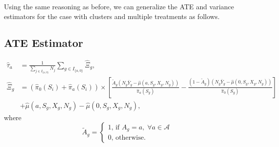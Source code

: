 \documentclass{article}
\begin{document}
Using the same reasoning as before, we can generalize the ATE and variance estimators for the case with clusters and multiple treatments as follows.
\subsection*{ATE Estimator}
\begin{align}
\hat{\tau}_a &= \frac{1}{\sum_{j \in I_{\{a,0\}}}N_j} \sum_{g \in I_{\{a,0\}}} \hat{\Xi}_g, \nonumber \\
\hat{\Xi}_g &= (\hat{\pi}_0(S_i) + \hat{\pi}_a(S_i)) \times \left[\frac{\tilde{A}_g \left(N_g\bar{Y}_g - \hat{\mu}(a,S_g,X_g,N_g)\right)}{\hat{\pi}_a(S_g)} - \frac{(1 - \tilde{A}_g) \left(N_g\bar{Y}_g - \hat{\mu}(0,S_g,X_g,N_g)\right)}{\hat{\pi}_0(S_g)}\right] \nonumber \\
 &+ \hat{\mu}(a,S_g,X_g,N_g) - \hat{\mu}(0,S_g,X_g,N_g), \nonumber
\end{align}
where 
\[\tilde{A}_g = \begin{cases}1\text{, if }A_g = a, \; \forall a \in \mathcal{A} \\ 0\text{, otherwise.}\end{cases}\]
\end{document}
